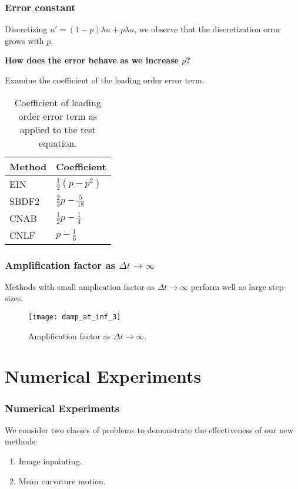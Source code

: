 \documentclass[hyperref={pdfpagelabels=false}]{beamer}
\begin{document}
\begin{frame}
	\frametitle{Error constant}
Discretizing $u' = (1- p)\lambda u + p\lambda u$, we observe that the discretization error grows with $p$.

\textbf{How does the error behave as we increase $p$?}

Examine the coefficient of the leading order error term.
\vspace{-11pt}
\begin{table}[b]
	\centering 
	\caption{Coefficient of leading order error term as applied to the test equation.}
\renewcommand{\arraystretch}{1.10}
	\begin{tabular}{ll} 
		\toprule 
Method & Coefficient 
\\ \midrule 
EIN & $\frac{1}{2}(p-p^2)$ 
\\
SBDF2 & $\frac{2}{3}p - \frac{5}{18}$
\\ 
CNAB & $\frac{1}{2}p-\frac{1}{4}$
\\ 
CNLF & $p-\frac{1}{6}$
\\ \bottomrule
		\end{tabular}
	\end{table}
\end{frame}

\begin{frame}
	\frametitle{Amplification factor as $\Delta t\to\infty$}
Methods with small amplication factor as $\Delta t \to \infty$ perform well as large step-sizes. 
\vspace{-5pt}
\begin{figure}
	\centering 
	\texttt{[image: damp\_at\_inf\_3]}
	\caption{Amplification factor as $\Delta t \to \infty$.}
\end{figure}
\end{frame}

\section{Numerical Experiments}
\begin{frame}
        \frametitle{Numerical Experiments} 
We consider two classes of problems to demonstrate the effectiveness of our new methods: 
\begin{enumerate}
        \item Image inpainting.
	\item Mean curvature motion.
\end{enumerate}

\end{frame}
\end{document}
